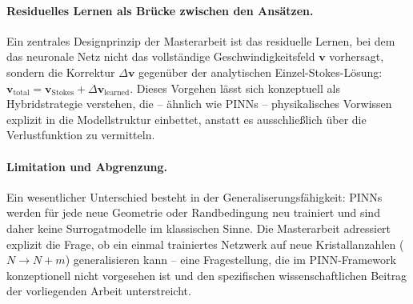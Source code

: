 \documentclass[a4paper,12pt]{article}
\begin{document}
\paragraph{Residuelles Lernen als Brücke zwischen den Ansätzen.}
Ein zentrales Designprinzip der Masterarbeit ist das residuelle Lernen, bei dem das neuronale Netz nicht das vollständige Geschwindigkeitsfeld $\mathbf{v}$ vorhersagt, sondern die Korrektur $\Delta\mathbf{v}$ gegenüber der analytischen Einzel-Stokes-Lösung: $\mathbf{v}_\mathrm{total} = \mathbf{v}_\mathrm{Stokes} + \Delta\mathbf{v}_\mathrm{learned}$. Dieses Vorgehen lässt sich konzeptuell als Hybridstrategie verstehen, die -- ähnlich wie PINNs -- physikalisches Vorwissen explizit in die Modellstruktur einbettet, anstatt es ausschließlich über die Verlustfunktion zu vermitteln.

\paragraph{Limitation und Abgrenzung.}
Ein wesentlicher Unterschied besteht in der Generaliserungsfähigkeit: PINNs werden für jede neue Geometrie oder Randbedingung neu trainiert und sind daher keine Surrogatmodelle im klassischen Sinne. Die Masterarbeit adressiert explizit die Frage, ob ein einmal trainiertes Netzwerk auf neue Kristallanzahlen ($N \to N{+}m$) generalisieren kann -- eine Fragestellung, die im PINN-Framework konzeptionell nicht vorgesehen ist und den spezifischen wissenschaftlichen Beitrag der vorliegenden Arbeit unterstreicht.
\end{document}
